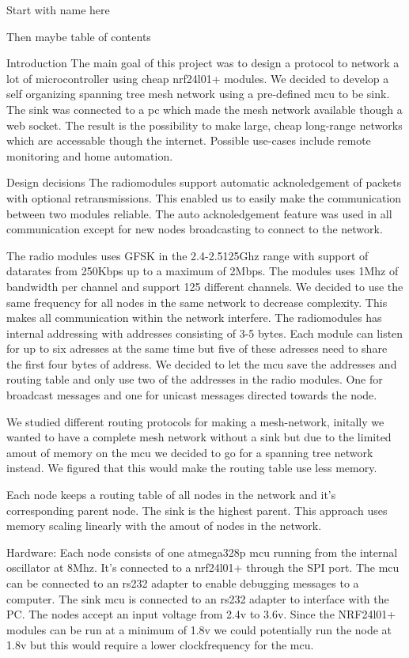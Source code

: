 
Start with name here


Then maybe table of contents


Introduction
The main goal of this project was to design a protocol to network a lot of microcontroller using cheap nrf24l01+ modules.
We decided to develop a self organizing spanning tree mesh network using a pre-defined mcu to be sink. 
The sink was connected to a pc which made the mesh network available though a web socket.
The result is the possibility to make large, cheap long-range networks which are accessable though the internet. 
Possible use-cases include remote monitoring and  home automation. 

Design decisions
The radiomodules support automatic acknoledgement of packets with optional retransmissions. This enabled us to easily make the communication between two modules reliable. The auto acknoledgement feature was used in all communication except for new nodes broadcasting to connect to the network.

The radio modules uses GFSK in the 2.4-2.5125Ghz range with support of datarates from 250Kbps up to a maximum of 2Mbps. The modules uses 1Mhz of bandwidth per channel and support 125 different channels. We decided to use the same frequency for all nodes in the same network to decrease complexity. This makes all communication within the network interfere. 
The radiomodules has internal addressing with addresses consisting of 3-5 bytes. Each module can listen for up to six adresses at the same time but five of these adresses need to share the first four bytes of address. We decided to let the mcu save the addresses and routing table and only use two of the addresses in the radio modules. One for broadcast messages and one for unicast messages directed towards the node. 

We studied different routing protocols for making a mesh-network, initally we wanted to have a complete mesh network without a sink but due to the limited amout of memory on the mcu we decided to go for a spanning tree network instead. We figured that this would make the routing table use less memory.

Each node keeps a routing table of all nodes in the network and it's corresponding parent node. The sink is the highest parent. This approach uses memory scaling linearly with the amout of nodes in the network. 

Hardware:
Each node consists of one atmega328p mcu running from the internal oscillator at 8Mhz. It's connected to a nrf24l01+ through the SPI port. The mcu can be connected to an rs232 adapter to enable debugging messages to a computer. The sink mcu is connected to an rs232 adapter to interface with the PC. The nodes accept an input voltage from 2.4v to 3.6v. Since the NRF24l01+ modules can be run at a minimum of 1.8v we could potentially run the node at 1.8v but this would require a lower clockfrequency for the mcu. 




